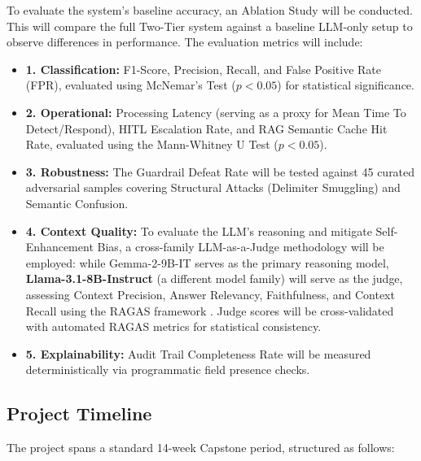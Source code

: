 \documentclass[12pt,a4paper]{article}
\begin{document}
To evaluate the system's baseline accuracy, an Ablation Study will be conducted. This will compare the full Two-Tier system against a baseline LLM-only setup to observe differences in performance.
The evaluation metrics will include:
\begin{itemize}
    \item \textbf{1. Classification:} F1-Score, Precision, Recall, and False Positive Rate (FPR), evaluated using McNemar's Test ($p<0.05$) for statistical significance.
    \item \textbf{2. Operational:} Processing Latency (serving as a proxy for Mean Time To Detect/Respond), HITL Escalation Rate, and RAG Semantic Cache Hit Rate, evaluated using the Mann-Whitney U Test ($p<0.05$).
    \item \textbf{3. Robustness:} The Guardrail Defeat Rate will be tested against 45 curated adversarial samples covering Structural Attacks (Delimiter Smuggling) and Semantic Confusion.
    \item \textbf{4. Context Quality:} To evaluate the LLM's reasoning and mitigate Self-Enhancement Bias, a cross-family LLM-as-a-Judge methodology will be employed: while Gemma-2-9B-IT serves as the primary reasoning model, \textbf{Llama-3.1-8B-Instruct} (a different model family) will serve as the judge, assessing Context Precision, Answer Relevancy, Faithfulness, and Context Recall using the RAGAS framework \cite{ragas2023}. Judge scores will be cross-validated with automated RAGAS metrics for statistical consistency.
    \item \textbf{5. Explainability:} Audit Trail Completeness Rate will be measured deterministically via programmatic field presence checks.
\end{itemize}

\subsection{Project Timeline}
The project spans a standard 14-week Capstone period, structured as follows:
\end{document}
